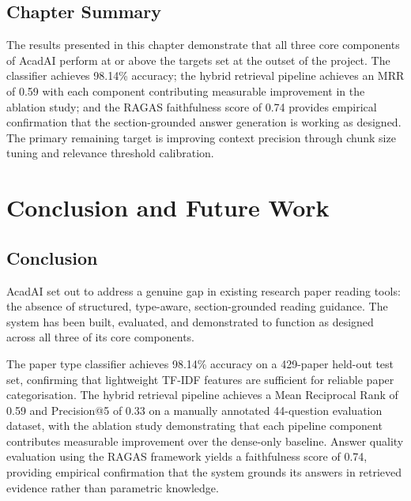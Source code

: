 \documentclass[12pt,a4paper]{report}
\begin{document}
\section{Chapter Summary}

The results presented in this chapter demonstrate that all three core components
of AcadAI perform at or above the targets set at the outset of the project. The
classifier achieves 98.14\% accuracy; the hybrid retrieval pipeline achieves an
MRR of 0.59 with each component contributing measurable improvement in the
ablation study; and the RAGAS faithfulness score of 0.74 provides empirical
confirmation that the section-grounded answer generation is working as designed.
The primary remaining target is improving context precision through chunk size
tuning and relevance threshold calibration.

\chapter{Conclusion and Future Work}

\section{Conclusion}

AcadAI set out to address a genuine gap in existing research paper reading
tools: the absence of structured, type-aware, section-grounded reading guidance.
The system has been built, evaluated, and demonstrated to function as designed
across all three of its core components.

The paper type classifier achieves 98.14\% accuracy on a 429-paper held-out test
set, confirming that lightweight TF-IDF features are sufficient for reliable
paper categorisation. The hybrid retrieval pipeline achieves a Mean Reciprocal
Rank of 0.59 and Precision@5 of 0.33 on a manually annotated 44-question
evaluation dataset, with the ablation study demonstrating that each pipeline
component contributes measurable improvement over the dense-only baseline.
Answer quality evaluation using the RAGAS framework yields a faithfulness score
of 0.74, providing empirical confirmation that the system grounds its answers in
retrieved evidence rather than parametric knowledge.
\end{document}
